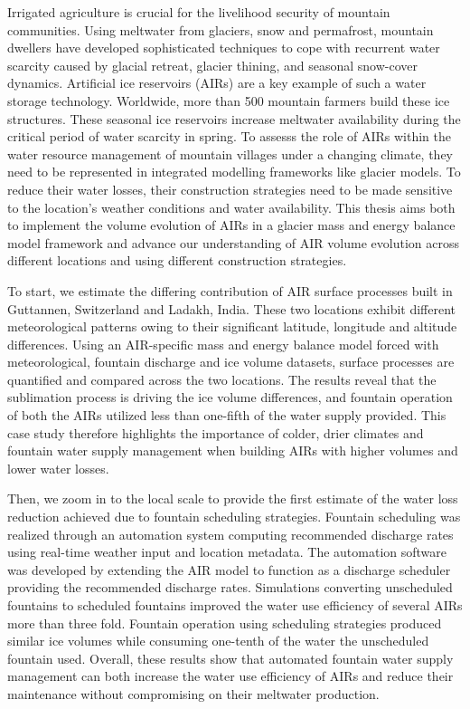 %
\label{sec:abstract}

Irrigated agriculture is crucial for the livelihood security of mountain communities. Using meltwater from
glaciers, snow and permafrost, mountain dwellers have developed sophisticated techniques to cope with recurrent
water scarcity caused by glacial retreat, glacier thining, and seasonal snow-cover dynamics. Artificial ice
reservoirs (AIRs) are a key example of such a water storage technology. Worldwide, more than 500 mountain
farmers build these ice structures. These seasonal ice reservoirs increase meltwater availability during the
critical period of water scarcity in spring. To assesss the role of AIRs within the water resource management of
mountain villages under a changing climate, they need to be represented in integrated modelling frameworks like
glacier models. To reduce their water losses, their construction strategies need to be made sensitive to the
location's weather conditions and water availability. This thesis aims both to implement the volume evolution of
AIRs in a glacier mass and energy balance model framework and advance our understanding of AIR volume evolution
across different locations and using different construction strategies.  

To start, we estimate the differing contribution of AIR surface processes built in Guttannen, Switzerland and
Ladakh, India. These two locations exhibit different meteorological patterns owing to their significant
latitude, longitude and altitude differences. Using an AIR-specific mass and energy balance model forced with
meteorological, fountain discharge and ice volume datasets, surface processes are quantified and compared across
the two locations. The results reveal that the sublimation process is driving the ice volume differences, and
fountain operation of both the AIRs utilized less than one-fifth of the water supply provided. This case study
therefore highlights the importance of colder, drier climates and fountain water supply management when building
AIRs with higher volumes and lower water losses.  

Then, we zoom in to the local scale to provide the first estimate of the water loss reduction achieved due to
fountain scheduling strategies. Fountain scheduling was realized through an automation system computing
recommended discharge rates using real-time weather input and location metadata. The automation software was
developed by extending the AIR model to function as a discharge scheduler providing the recommended discharge
rates. Simulations converting unscheduled fountains to scheduled fountains improved the water use efficiency of
several AIRs more than three fold. Fountain operation using scheduling strategies produced similar ice volumes
while consuming one-tenth of the water the unscheduled fountain used.  Overall, these results show that
automated fountain water supply management can both increase the water use efficiency of AIRs and reduce their
maintenance without compromising on their meltwater production.

